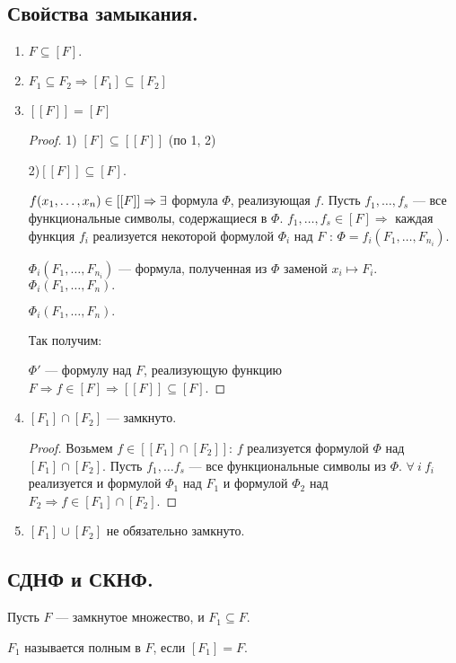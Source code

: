 \subsection{Свойства замыкания.}
\begin{enumerate}
	\item $F \subseteq [F].$
	\item $F_1 \subseteq F_2 \Longrightarrow [F_1] \subseteq [F_2]$
	\item $[[F]] = [F]$
	\begin{proof}
		1) $[F] \subseteq [[F]]$ (по 1, 2)

		2)$[[F]] \subseteq [F]$.

		$f(x_1, \ldots, x_n) \in [[F]] \Rightarrow \exists$ формула $\Phi$, реализующая $f$. Пусть $f_1, \ldots, f_s$ --- все функциональные символы, содержащиеся в $\Phi$. $f_1, \ldots, f_s \in [F] \Rightarrow $ каждая функция $f_i$ реализуется некоторой формулой $\Phi_i$ над $F$ : $\Phi = f_i(F_1, \ldots, F_{n_i})$.

		$\Phi_i(F_1, \ldots, F_{n_i})$ --- формула, полученная из $\Phi$ заменой $x_i \longmapsto F_i$. $\Phi_i(F_1, \ldots, F_n).$

		$\Phi_i(F_1, \ldots, F_n).$

		Так получим: 

		$\Phi'$ --- формулу над $F$, реализующую функцию $F \Rightarrow f \in [F] \Rightarrow [[F]] \subseteq [F]$.
	\end{proof}
	\item  $[F_1] \cap [F_2]$ --- замкнуто.
	\begin{proof}
		Возьмем $f \in [[F_1] \cap [F_2]]$: $f$ реализуется формулой $\Phi$ над $[F_1] \cap [F_2]$. Пусть $f_1, \ldots f_s$ --- все функциональные символы из $\Phi$. $\forall \: i \: f_i$ реализуется и формулой $\Phi_1$ над $F_1$ и формулой $\Phi_2$ над $F_2 \Rightarrow f \in  [F_1] \cap [F_2]$.
	\end{proof}
	\item  $[F_1] \cup [F_2]$ не обязательно замкнуто.
\end{enumerate}

\subsection{СДНФ и СКНФ.}
Пусть $F$ --- замкнутое множество, и $F_1 \subseteq F$.

\begin{definition}
	$F_1$ называется полным в $F$, если $[F_1] = F$.
\end{definition}

